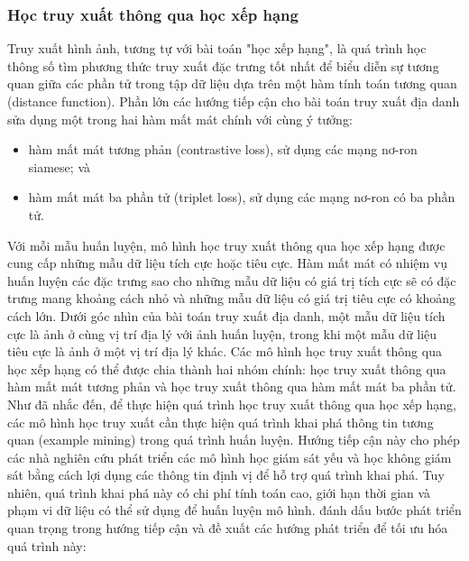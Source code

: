 \subsubsection{Học truy xuất thông qua học xếp hạng}

Truy xuất hình ảnh, tương tự với bài toán "học xếp hạng", là quá trình học thông số tìm phương thức truy xuất đặc trưng tốt nhất để biểu diễn sự tương quan giữa các phần tử trong tập dữ liệu dựa trên một hàm tính toán tương quan (distance function). Phần lớn các hướng tiếp cận cho bài toán truy xuất địa danh sửa dụng một trong hai hàm mất mát chính với cùng ý tưởng:

\begin{itemize}
    \item hàm mất mát tương phản (contrastive loss), sử dụng các mạng nơ-ron siamese\cite{ong2017siamese, GeM, randenovic2016BoW}; và
    \item hàm mất mát ba phần tử (triplet loss), sử dụng các mạng nơ-ron có ba phần tử\cite{arandjelovic2016netvlad, gordo2016deep, gordo2017endtoend, wang2014learning, jin2017learned, zheng2018sift}.
\end{itemize}

Với mỗi mẫu huấn luyện, mô hình học truy xuất thông qua học xếp hạng được cung cấp những mẫu dữ liệu tích cực hoặc tiêu cực. Hàm mất mát có nhiệm vụ huấn luyện các đặc trưng sao cho những mẫu dữ liệu có giá trị tích cực sẽ có đặc trưng mang khoảng cách nhỏ và những mẫu dữ liệu có giá trị tiêu cực có khoảng cách lớn. Dưới góc nhìn của bài toán truy xuất địa danh, một mẫu dữ liệu tích cực là ảnh ở cùng vị trí địa lý với ảnh huấn luyện, trong khi một mẫu dữ liệu tiêu cực là ảnh ở một vị trí địa lý khác. Các mô hình học truy xuất thông qua học xếp hạng có thể được chia thành hai nhóm chính: học truy xuất thông qua hàm mất mát tương phản và học truy xuất thông qua hàm mất mát ba phần tử. Như đã nhắc đến, để thực hiện quá trình học truy xuất thông qua học xếp hạng, các mô hình học truy xuất cần thực hiện quá trình khai phá thông tin tương quan (example mining) trong quá trình huấn luyện. Hướng tiếp cận này cho phép các nhà nghiên cứu phát triển các mô hình học giám sát yếu\cite{arandjelovic2016netvlad, jin2017learned} và học không giám sát\cite{radenovic2018fine} bằng cách lợi dụng các thông tin định vị để hỗ trợ quá trình khai phá. Tuy nhiên, quá trình khai phá này có chi phí tính toán cao, giới hạn thời gian và phạm vi dữ liệu có thể sử dụng để huấn luyện mô hình. \cite{arandjelovic2016netvlad} đánh dấu bước phát triển quan trọng trong hướng tiếp cận và đề xuất các hướng phát triển để tối ưu hóa quá trình này:

